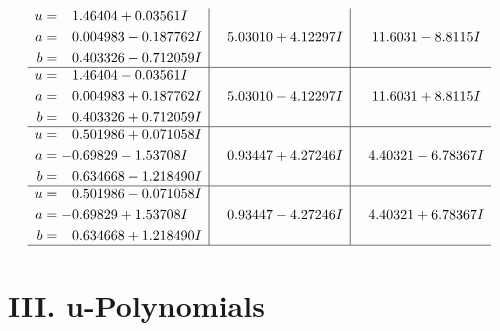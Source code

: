 \documentclass[1p]{elsarticle_modified}
\theoremstyle{definition}
\begin{document}
$$\begin{array}{c|c|c}
\begin{aligned}
u &= \phantom{-}1.46404 + 0.03561 I \\
a &= \phantom{-}0.004983 - 0.187762 I \\
b &= \phantom{-}0.403326 - 0.712059 I\end{aligned}
 & \phantom{-}5.03010 + 4.12297 I & \phantom{-}11.6031 - 8.8115 I \\ \hline\begin{aligned}
u &= \phantom{-}1.46404 - 0.03561 I \\
a &= \phantom{-}0.004983 + 0.187762 I \\
b &= \phantom{-}0.403326 + 0.712059 I\end{aligned}
 & \phantom{-}5.03010 - 4.12297 I & \phantom{-}11.6031 + 8.8115 I \\ \hline\begin{aligned}
u &= \phantom{-}0.501986 + 0.071058 I \\
a &= -0.69829 - 1.53708 I \\
b &= \phantom{-}0.634668 - 1.218490 I\end{aligned}
 & \phantom{-}0.93447 + 4.27246 I & \phantom{-}4.40321 - 6.78367 I \\ \hline\begin{aligned}
u &= \phantom{-}0.501986 - 0.071058 I \\
a &= -0.69829 + 1.53708 I \\
b &= \phantom{-}0.634668 + 1.218490 I\end{aligned}
 & \phantom{-}0.93447 - 4.27246 I & \phantom{-}4.40321 + 6.78367 I\\
 \hline 
 \end{array}$$\newpage
\newpage\renewcommand{\arraystretch}{1}
\centering \section*{ III. u-Polynomials}
\end{document}

